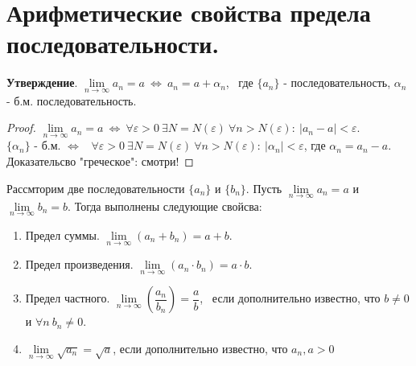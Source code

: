 \documentclass[12pt]{article}
\begin{document}
\section{Арифметические свойства предела последовательности.}
\textbf{Утверждение}. $\lim\limits_{n \to \infty} a_n  = a \ \Leftrightarrow \ a_n = a + \alpha_n$, \ где $\{a_n\}$ - последовательность, $\alpha_n$ - б.м. последовательность. 
\begin{proof}
    $\lim\limits_{n \to \infty} a_n  = a \ \Leftrightarrow \ \forall \varepsilon > 0 \ \exists N = N(\varepsilon) \ \forall n > N(\varepsilon): \ |a_n - a| < \varepsilon$. \\
    $\{\alpha_n\}$ - б.м. $\Leftrightarrow$ \ $\forall \varepsilon > 0 \ \exists N = N(\varepsilon) \ \forall n > N(\varepsilon): \ |\alpha_n| < \varepsilon$, где $\alpha_n = a_n - a$. \\
    Доказательсво "греческое": смотри!
\end{proof}
Рассмторим две последовательности $\{a_n\}$ и $\{b_n\}$. Пусть $\lim\limits_{n \to \infty} a_n = a$ и $\lim\limits_{n \to \infty} b_n = b$. Тогда выполнены следующие свойсва: 
\begin{enumerate}[itemsep=0mm, topsep=0mm, partopsep=0mm]
    \item Предел суммы. $\lim\limits_{n \to \infty} (a_n + b_n) = a + b$.
    \item Предел произведения. $\lim\limits_{n \to \infty} (a_n \cdot b_n) = a \cdot b$.
    \item Предел частного. $\lim\limits_{n \to \infty} \left(\dfrac{a_n}{b_n}\right) = \dfrac{a}{b}$, \ если дополнительно известно, что $b \neq 0$ и $\forall n \ b_n \neq 0$.
    \item $\lim\limits_{n\to\infty}\sqrt{a_n} = \sqrt{a}$, если дополнительно известно, что $a_n, a > 0$
\end{enumerate}
\end{document}
